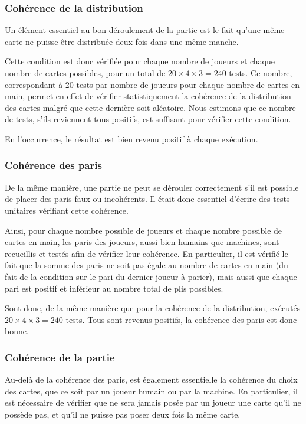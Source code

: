       \subsubsection{Cohérence de la distribution}
         Un élément essentiel au bon déroulement de la partie est le fait qu'une même carte ne puisse être distribuée deux fois dans une même manche.

         Cette condition est donc vérifiée pour chaque nombre de joueurs et chaque nombre de cartes possibles, pour un total de $20\times 4\times 3 = 240$ tests.
         Ce nombre, correspondant à 20 tests par nombre de joueurs pour chaque nombre de cartes en main, permet en effet de vérifier statistiquement la cohérence de la distribution des cartes malgré que cette dernière soit aléatoire.
         Nous estimons que ce nombre de tests, s'ils reviennent tous positifs, est suffisant pour vérifier cette condition.

         En l'occurrence, le résultat est bien revenu positif à chaque exécution.

      \subsubsection{Cohérence des paris}
         De la même manière, une partie ne peut se dérouler correctement s'il est possible de placer des paris faux ou incohérents.
         Il était donc essentiel d'écrire des tests unitaires vérifiant cette cohérence.

         Ainsi, pour chaque nombre possible de joueurs et chaque nombre possible de cartes en main, les paris des joueurs, aussi bien humains que machines, sont recueillis et testés afin de vérifier leur cohérence.
         En particulier, il est vérifié le fait que la somme des paris ne soit pas égale au nombre de cartes en main (du fait de la condition sur le pari du dernier joueur à parier), mais aussi que chaque pari est positif et inférieur au nombre total de plis possibles.

         Sont donc, de la même manière que pour la cohérence de la distribution, exécutés $20\times 4\times 3 = 240$ tests.
         Tous sont revenus positifs, la cohérence des paris est donc bonne.

      \subsubsection{Cohérence de la partie}
         Au-delà de la cohérence des paris, est également essentielle la cohérence du choix des cartes, que ce soit par un joueur humain ou par la machine.
         En particulier, il est nécessaire de vérifier que ne sera jamais posée par un joueur une carte qu'il ne possède pas, et qu'il ne puisse pas poser deux fois la même carte.

